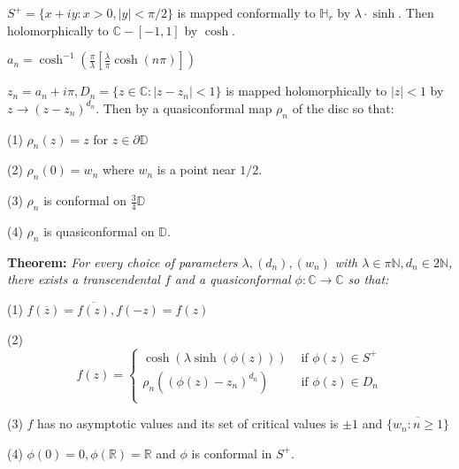 \documentclass{beamer}
\begin{document}
\begin{frame} 

{\tiny $S^+ = \{ x + iy : x > 0, |y| < \pi/2 \}$ is mapped conformally to $\mathbb{H}_r$ by $\lambda\cdot\sinh$. Then holomorphically to $\mathbb{C} - [-1,1]$ by $\cosh$.

\vspace{1.25mm}

$a_n = \cosh^{-1}\left( \frac{\pi}{\lambda} \left[ \frac{\lambda}{\pi} \cosh(n\pi) \right] \right)$

\vspace{1.25mm}

$z_n = a_n + i\pi, D_n = \{ z \in \mathbb{C} : \left| z - z_n \right| < 1\} $ is mapped holomorphically to $|z|<1$ by $z\rightarrow (z - z_n)^{d_n}$. Then by a quasiconformal map $\rho_n$ of the disc so that: 

\hspace{5mm} (1) $\rho_n(z)=z$ for $z\in\partial\mathbb{D}$

\hspace{5mm} (2) $\rho_n(0)=w_n$ where $w_n$ is a point near $1/2$.

\hspace{5mm} (3) $\rho_n$ is conformal on $\frac{3}{4}\mathbb{D}$

\hspace{5mm} (4) $\rho_n$ is quasiconformal on $\mathbb{D}$.  

}

\vspace{5mm}

{\bf Theorem:}  {\it For every choice of parameters $\lambda, (d_n), (w_n)$ with $\lambda \in \pi\mathbb{N}, d_n \in 2\mathbb{N}$, there exists a transcendental $f$ and a quasiconformal $\phi: \mathbb{C}\rightarrow\mathbb{C}$ so that:}

\hspace{5mm} (1) $f(\overline{z}) = \overline{f(z)}, f(-z)=f(z)$

\hspace{5mm} (2) \[ f(z) = \begin{cases} 
      \cosh(\lambda\sinh(\phi(z))) & \textrm{ if } \phi(z)\in S^+ \\
      \rho_n((\phi(z)-z_n)^{d_n}) & \textrm{ if } \phi(z)\in D_n \\
   \end{cases} \]
   
\hspace{5mm} (3) $f$ has no asymptotic values and its set of critical values is $\pm1$ and $\overline{\{w_n: n \geq 1\}}$

\hspace{5mm} (4) $\phi(0)=0, \phi(\mathbb{R})=\mathbb{R}$ and $\phi$ is conformal in $S^+$.


\end{frame}
\end{document}
